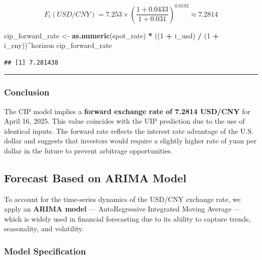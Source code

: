 \documentclass[
]{article}
\newenvironment{Shaded}{\begin{snugshade}}{\end{snugshade}}
\newcommand{\DecValTok}[1]{\textcolor[rgb]{0.00,0.00,0.81}{#1}}
\newcommand{\FunctionTok}[1]{\textcolor[rgb]{0.13,0.29,0.53}{\textbf{#1}}}
\newcommand{\NormalTok}[1]{#1}
\newcommand{\OtherTok}[1]{\textcolor[rgb]{0.56,0.35,0.01}{#1}}
\newcommand{\SpecialCharTok}[1]{\textcolor[rgb]{0.81,0.36,0.00}{\textbf{#1}}}
\begin{document}
\[
F_t(USD/CNY) = 7.253 \times \left( \frac{1 + 0.0433}{1 + 0.031} \right)^{0.0192} \approx \mathbf{7.2814}
\]

\begin{Shaded}
\begin{Highlighting}[]
\NormalTok{cip\_forward\_rate }\OtherTok{\textless{}{-}} \FunctionTok{as.numeric}\NormalTok{(spot\_rate) }\SpecialCharTok{*}\NormalTok{ ((}\DecValTok{1} \SpecialCharTok{+}\NormalTok{ i\_usd) }\SpecialCharTok{/}\NormalTok{ (}\DecValTok{1} \SpecialCharTok{+}\NormalTok{ i\_cny))}\SpecialCharTok{\^{}}\NormalTok{horizon}
\NormalTok{cip\_forward\_rate}
\end{Highlighting}
\end{Shaded}

\begin{verbatim}
## [1] 7.281438
\end{verbatim}

\begin{center}\rule{0.5\linewidth}{0.5pt}\end{center}

\subsubsection{Conclusion}\label{conclusion}

The CIP model implies a \textbf{forward exchange rate of 7.2814 USD/CNY}
for April 16, 2025. This value coincides with the UIP prediction due to
the use of identical inputs. The forward rate reflects the interest rate
advantage of the U.S. dollar and suggests that investors would require a
slightly higher rate of yuan per dollar in the future to prevent
arbitrage opportunities.

\subsection{Forecast Based on ARIMA
Model}\label{forecast-based-on-arima-model}

To account for the time-series dynamics of the USD/CNY exchange rate, we
apply an \textbf{ARIMA model} --- AutoRegressive Integrated Moving
Average --- which is widely used in financial forecasting due to its
ability to capture trends, seasonality, and volatility.

\subsubsection{Model Specification}\label{model-specification}
\end{document}
